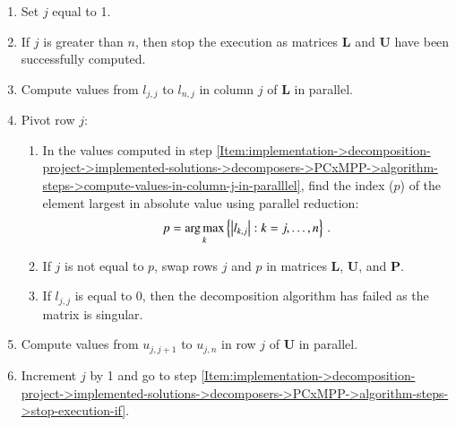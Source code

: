 \begin{enumerate}
	\item Set $j$ equal to 1.
	\item \label{Item:implementation->decomposition-project->implemented-solutions->decomposers->PCxMPP->algorithm-steps->stop-execution-if}
		If $j$ is greater than $n$, then stop the execution as matrices $\mathbf{L}$ and $\mathbf{U}$ have been successfully computed.
	\item \label{Item:implementation->decomposition-project->implemented-solutions->decomposers->PCxMPP->algorithm-steps->compute-values-in-column-j-in-paralllel}
		Compute values from $l_{j,j}$ to $l_{n,j}$ in column $j$ of $\mathbf{L}$ \colorbox{nvidia-light}{in parallel}.
	\item Pivot row $j$:
	\begin{enumerate}
		\item \label{Item:implementation->decomposition-project->implemented-solutions->decomposers->PCxMPP->algorithm-steps->piv-row-j-maxarg-in-paralllel}
			In the values computed in step \ref{Item:implementation->decomposition-project->implemented-solutions->decomposers->PCxMPP->algorithm-steps->compute-values-in-column-j-in-paralllel}, find the index ($p$) of the element largest in absolute value \colorbox{nvidia-light}{using parallel reduction}:
		\begin{equation}
			p = \operatorname*{arg\,max}_k \left\{ \left| l_{k, j} \right|: k=j,\dots, n \right\} \,.
		\end{equation}
		\item If $j$ is not equal to $p$, swap rows $j$ and $p$ in matrices $\mathbf{L}$, $\mathbf{U}$, and $\mathbf{P}$.
		\item If $l_{j,j}$ is equal to 0, then the decomposition algorithm has failed as the matrix is singular.
	\end{enumerate}
	\item \label{Item:implementation->decomposition-project->implemented-solutions->decomposers->PCxMPP->algorithm-steps->compute-values-in-row-j-in-paralllel}
		Compute values from $u_{j,j+1}$ to $u_{j,n}$ in row $j$ of $\mathbf{U}$ \colorbox{nvidia-light}{in parallel}.
	\item Increment $j$ by 1 and go to step \ref{Item:implementation->decomposition-project->implemented-solutions->decomposers->PCxMPP->algorithm-steps->stop-execution-if}.
\end{enumerate}

